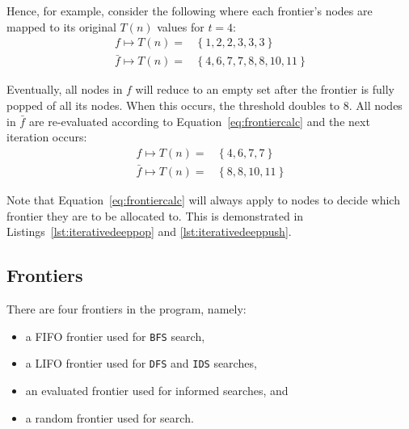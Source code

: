 Hence, for example, consider the following where each frontier's nodes are
mapped to its original $T(n)$ values for $t=4$:
\begin{align*}
      f  \mapsto T(n) =& \ \{ \ 1 , 2 , 2 , 3 , 3 , 3 \ \}\\
 \bar{f} \mapsto T(n) =& \ \{ \ 4 , 6 , 7 , 7 , 8 , 8 , 10, 11 \ \}
\end{align*}

Eventually, all nodes in $f$ will reduce to an empty set after the frontier is
fully popped of all its nodes. When this occurs, the threshold doubles to 8.
All nodes in $\bar{f}$ are re-evaluated according to Equation~\ref{eq:frontiercalc}
and the next iteration occurs:
\begin{align*}
       f  \mapsto T(n) =& \ \{ \ 4 , 6 , 7 , 7  \ \}\\
  \bar{f} \mapsto T(n) =& \ \{ \ 8 , 8 , 10, 11 \ \}
\end{align*}

Note that Equation~\ref{eq:frontiercalc} will always apply to nodes to decide
which frontier they are to be allocated to. This is demonstrated in
Listings~\ref{lst:iterativedeeppop} and \ref{lst:iterativedeeppush}.





\subsection{Frontiers}
\label{sub:Frontiers}

There are four frontiers in the program, namely:

\begin{itemize}
  \item a FIFO frontier used for \texttt{BFS} search,
  \item a LIFO frontier used for \texttt{DFS} and \texttt{IDS} searches,
  \item an evaluated frontier used for informed searches, and
  \item a random frontier used for  search.
\end{itemize}


